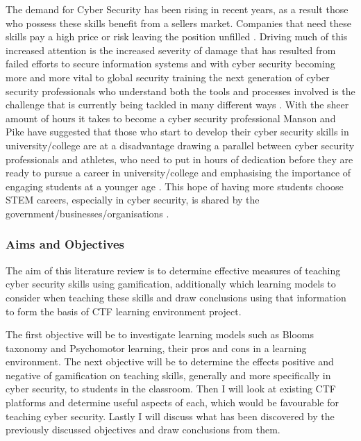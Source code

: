 \documentclass[12pt,a4paper]{article}
\begin{document}
The demand for Cyber Security has been rising in recent years, as a result those who possess these skills benefit from a sellers market. Companies that need these skills pay a high price or risk leaving the position unfilled \cite{libicki2014hackers}. Driving much of this increased attention is the increased severity of damage that has resulted from failed efforts to secure information systems \cite{albert2010high2} and with cyber security becoming more and more vital to global security \cite{nagarajan2012exploring6} training the next generation of cyber security professionals who understand both the tools and processes involved is the challenge that is currently being tackled in many different ways \cite{buchanan2011blending3}. With the sheer amount of hours it takes to become a cyber security professional Manson and Pike have suggested that those who start to develop their cyber security skills in university/college are at a disadvantage drawing a parallel between cyber security professionals and athletes, who need to put in hours of dedication before they are ready to pursue a career in university/college and emphasising the importance of engaging students at a younger age \cite{manson2014case}. This hope of having more students choose STEM careers, especially in cyber security, is shared by the government/businesses/organisations \cite{albert2010high4}. 

 
\subsubsection{Aims and Objectives}
The aim of this literature review is to determine effective measures of teaching cyber security skills using gamification, additionally which learning models to consider when teaching these skills and draw conclusions using that information to form the basis of CTF learning environment project. 


The first objective will be to investigate learning models such as Blooms taxonomy and Psychomotor learning, their pros and cons in a learning environment. The next objective will be to determine the effects positive and negative of gamification on teaching skills, generally and more specifically in cyber security, to students in the classroom. Then I will look at existing CTF platforms and determine useful aspects of each, which would be favourable for teaching cyber security. Lastly I will discuss what has been discovered by the previously discussed objectives and draw conclusions from them.
\end{document}
